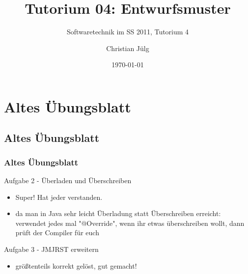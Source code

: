

\title[Tutorium04]{Tutorium 04: Entwurfsmuster}
\subtitle{Softwaretechnik im SS 2011, Tutorium 4}
\author{Christian Jülg}
\date{\today}




\begin{frame}
\titlepage
\end{frame}


\section{Altes Übungsblatt}

\subsection{Altes Übungsblatt}


\begin{frame}[fragile]
\frametitle{Altes Übungsblatt}
	\begin{block}{Aufgabe 2 - Überladen und Überschreiben}
	\begin{itemize}
	\item Super! Hat jeder verstanden.
	\item da man in Java sehr leicht Überladung statt Überschreiben erreicht: \\
		verwendet jedes mal "@Override", wenn ihr etwas überschreiben wollt, dann prüft der Compiler für euch
	\end{itemize}
	\end{block}
	\pause
	\begin{block}{Aufgabe 3 - JMJRST erweitern} 
	\begin{itemize}
	\item größtenteils korrekt gelöst, gut gemacht!
	\end{itemize}
	\end{block}
\end{frame}

